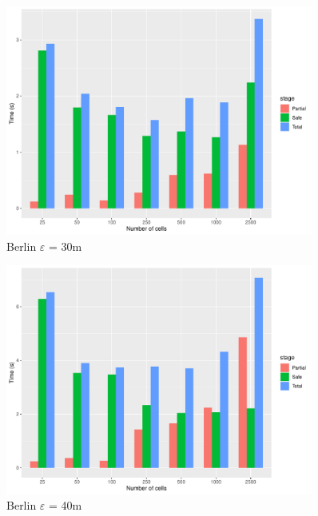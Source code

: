\documentclass[a4paper,10pt]{article}
\begin{document}
\begin{figure}[h!]
 \centering
 \includegraphics[width=0.9\textwidth]{berlinE30_partitions.pdf}
 \caption{Berlin $\varepsilon$ = 30m}
 \label{fig:berlin30}
\end{figure}

\begin{figure}[h!]
 \centering
 \includegraphics[width=0.9\textwidth]{berlinE40_partitions.pdf}
 \caption{Berlin $\varepsilon$ = 40m}
 \label{fig:berlin40}
\end{figure}
\end{document}
